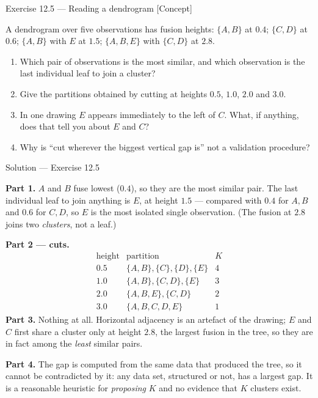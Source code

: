 \documentclass[aspectratio=169,11pt]{beamer}
\begin{document}
\begin{frame}{Exercise 12.5 --- Reading a dendrogram [Concept]}
\begin{exercise}
  A dendrogram over five observations has fusion heights: $\{A,B\}$ at $0.4$;
  $\{C,D\}$ at $0.6$; $\{A,B\}$ with $E$ at $1.5$; $\{A,B,E\}$ with $\{C,D\}$ at $2.8$.
  \begin{enumerate}
    \item Which pair of observations is the most similar, and which observation is the last
          individual leaf to join a cluster?
    \item Give the partitions obtained by cutting at heights $0.5$, $1.0$, $2.0$ and
          $3.0$.
    \item In one drawing $E$ appears immediately to the left of $C$. What, if anything,
          does that tell you about $E$ and $C$?
    \item Why is ``cut wherever the biggest vertical gap is'' not a validation procedure?
  \end{enumerate}
\end{exercise}
\end{frame}

\begin{frame}{Solution --- Exercise 12.5}
\begin{solutionbox}
  \textbf{Part 1.} $A$ and $B$ fuse lowest ($0.4$), so they are the most similar pair. The
  last individual leaf to join anything is $E$, at height $1.5$ --- compared with $0.4$ for
  $A,B$ and $0.6$ for $C,D$, so $E$ is the most isolated single observation. (The fusion at
  $2.8$ joins two \emph{clusters}, not a leaf.)

  \medskip
  \textbf{Part 2 --- cuts.}
  \[
    \begin{array}{c|l|c}
      \text{height} & \text{partition} & K\\ \hline
      0.5 & \{A,B\},\{C\},\{D\},\{E\} & 4\\
      1.0 & \{A,B\},\{C,D\},\{E\} & 3\\
      2.0 & \{A,B,E\},\{C,D\} & 2\\
      3.0 & \{A,B,C,D,E\} & 1
    \end{array}
  \]
  \textbf{Part 3.} Nothing at all. Horizontal adjacency is an artefact of the drawing; $E$
  and $C$ first share a cluster only at height $2.8$, the largest fusion in the tree, so
  they are in fact among the \emph{least} similar pairs.

  \medskip
  \textbf{Part 4.} The gap is computed from the same data that produced the tree, so it
  cannot be contradicted by it: any data set, structured or not, has a largest gap. It is a
  reasonable heuristic for \emph{proposing} $K$ and no evidence that $K$ clusters exist.
\end{solutionbox}
\end{frame}
\end{document}
